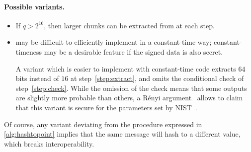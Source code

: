 \paragraph{Possible variants.}
\begin{itemize}

\item If $q > 2^{16}$, then larger chunks can be extracted from \shake
at each step.

\item \hashtopoint may be difficult to efficiently
implement in a constant-time way; constant-timeness may be a desirable
feature if the signed data is also secret.

A variant which is easier to
implement with constant-time code extracts $64$ bits instead of $16$ at
step~\ref{step:extract}, and omits the conditional check of
step~\ref{step:check}. While the omission of the check means that some
outputs are slightly more probable than others, a
Rényi argument~\cite{AC:BLLSS15,AC:Prest17} allows to claim that this variant is
secure for the parameters set by NIST~\cite{NIST}.

\end{itemize}

Of course, any variant deviating from the procedure expressed in
\cref{alg:hashtopoint} implies that the same message will hash
to a different value, which breaks interoperability.

% 
% 


